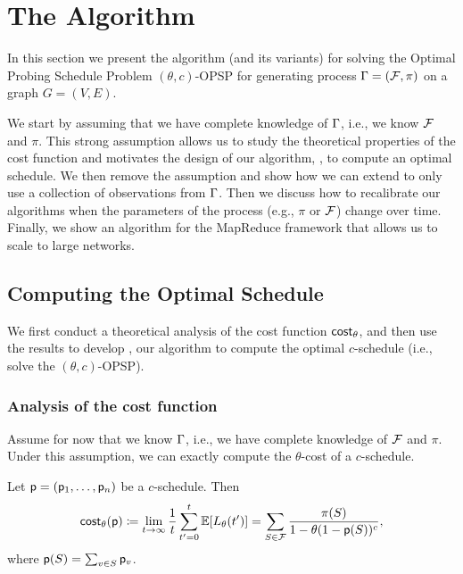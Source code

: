 \section{The \algonamebasecaps{} Algorithm}\label{sec:method}
In this section we present the algorithm \algoname
(and its variants) for solving
the Optimal Probing Schedule Problem $(\theta,c)$-OPSP for generating process
$\Gamma=(\mathcal{F},\pi)$ on a graph $G=(V,E)$.

We start by assuming that we have complete knowledge of $\Gamma$, i.e., we know
$\mathcal{F}$ and $\pi$. This strong assumption allows us to study the theoretical
properties of the cost function and motivates the design of our algorithm,
\algoname, to compute an optimal schedule. We then remove the assumption and show
how we can extend \algoname to only use a collection of observations from
$\Gamma$. Then we discuss how to recalibrate our algorithms when the parameters of
the process (e.g., $\pi$ or $\mathcal{F}$) change over time.  Finally, we show an
algorithm for the MapReduce framework that allows us to scale to large networks.

\subsection{Computing the Optimal Schedule}\label{sec:optimize}
We first conduct a theoretical analysis of the cost function $\mathsf{cost}_\theta$,
and then use the results to develop \algoname, our algorithm to compute the
optimal $c$-schedule (i.e., solve the $(\theta,c)$-OPSP).

\subsubsection{Analysis of the cost function}
Assume for now that we know $\Gamma$, i.e., we have complete knowledge of
$\mathcal{F}$ and $\pi$. Under this assumption, we can exactly compute the
$\theta$-cost of a $c$-schedule.

\begin{lemma}\label{lem:explicit}
Let $\mathsf{p}=(\mathsf{p}_1,\ldots,\mathsf{p}_n)$ be a $c$-schedule. Then
\begin{equation}\label{eq:explicit}
	\mathsf{cost}_\theta(\mathsf{p}) \coloneqq
	\lim_{t\rightarrow\infty}\frac{1}{t}\sum_{t'=0}^t\mathbb{E}[L_\theta(t')] =
	\sum_{S\in \mathcal{F}} \frac{\pi(S)}{1- \theta(1-\mathsf{p}(S))^c},
\end{equation}
where $\mathsf{p}(S) = \sum_{v\in S} \mathsf{p}_v$.
\end{lemma}

